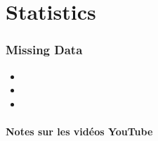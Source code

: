 \documentclass[12pt, titlepage, french]{report}
\begin{document}

\tableofcontents

\clearpage

\part*{Statistics}

\section{Missing Data}

\begin{YTB_vids}
\begin{itemize}
	\item	{}
	\item	{}
	\item	{}
\end{itemize}
\end{YTB_vids}

\subsection*{Notes sur les vidéos YouTube}
\end{document}
